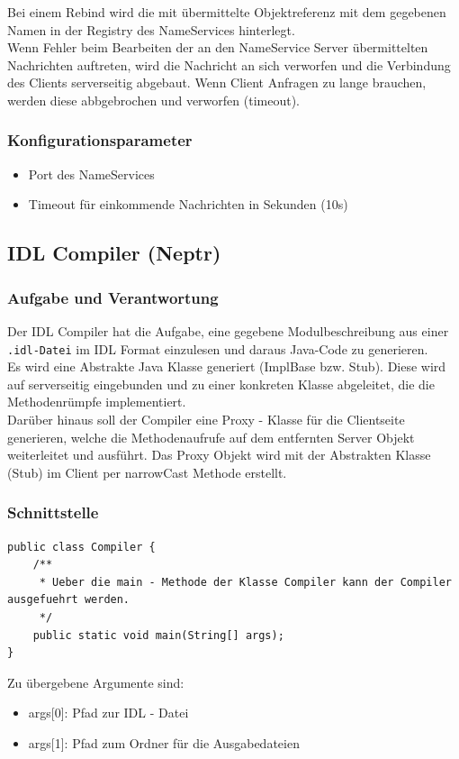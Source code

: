 \documentclass{article}
\begin{document}
Bei einem Rebind wird die mit übermittelte Objektreferenz mit dem gegebenen Namen in der Registry des NameServices
hinterlegt.\\

Wenn Fehler beim Bearbeiten der an den NameService Server übermittelten Nachrichten auftreten, wird die Nachricht an
sich verworfen und die Verbindung des Clients serverseitig abgebaut. Wenn Client Anfragen zu lange brauchen, werden
diese abbgebrochen und verworfen (timeout).

\subsubsection{Konfigurationsparameter}
\begin{itemize}
    \item Port des NameServices
    \item Timeout für einkommende Nachrichten in Sekunden (10s)
\end{itemize}

\subsection{IDL Compiler (Neptr)}
\subsubsection{Aufgabe und Verantwortung}
Der IDL Compiler hat die Aufgabe, eine gegebene Modulbeschreibung aus einer \texttt{.idl-Datei} im IDL Format einzulesen
und daraus Java-Code zu generieren.\\

Es wird eine Abstrakte Java Klasse generiert (ImplBase bzw. Stub). Diese wird auf serverseitig eingebunden und zu einer
konkreten Klasse abgeleitet, die die Methodenrümpfe implementiert.\\

Darüber hinaus soll der Compiler eine Proxy - Klasse für die Clientseite generieren, welche die Methodenaufrufe auf dem
entfernten Server Objekt weiterleitet und ausführt. Das Proxy Objekt wird mit der Abstrakten Klasse (Stub) im Client
per narrowCast Methode erstellt.

\subsubsection{Schnittstelle}
\begin{lstlisting}
public class Compiler {
    /**
     * Ueber die main - Methode der Klasse Compiler kann der Compiler ausgefuehrt werden.
     */
    public static void main(String[] args);
}
\end{lstlisting}
Zu übergebene Argumente sind:
\begin{itemize}
	\item args[0]: Pfad zur IDL - Datei
	\item args[1]: Pfad zum Ordner für die Ausgabedateien
\end{itemize}
\end{document}
